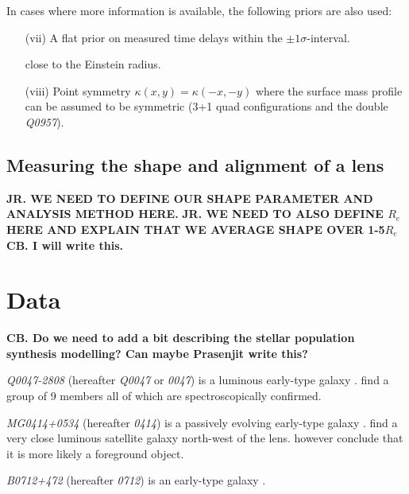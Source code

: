 \documentclass[useAMS,usenatbib]{mn2e}
\begin{document}
In cases where more information is available, the following priors are also used:

\begin{enumerate}
\item[(vii)] A flat prior on measured time delays within the $\pm 1\sigma$-interval.

close to the Einstein radius.

\item[(viii)] Point symmetry $\kappa(x,y) = \kappa(-x,-y)$ where 
the surface mass profile can be assumed to be symmetric (3+1 quad
configurations and the double \textit{Q0957}).

\end{enumerate}

\subsection{Measuring the shape and alignment of a lens}\label{sec:shapemethod}

{\bf JR. WE NEED TO DEFINE OUR SHAPE PARAMETER AND ANALYSIS METHOD HERE.} 
{\bf JR. WE NEED TO ALSO DEFINE $R_e$ HERE AND EXPLAIN THAT WE AVERAGE SHAPE OVER 1-5$R_e$} 
{\bf CB. I will write this.} 


\section{Data}\label{sec:data}

{\bf CB. Do we need to add a bit describing the stellar population synthesis modelling? Can maybe Prasenjit write this?} 


\textit{Q0047-2808} (hereafter \textit{Q0047} or \textit{0047}) is a luminous early-type galaxy \citep{1996MNRAS.278..139W}. \cite{2011ApJ...726...84W} find a group of 9 members all of which are spectroscopically confirmed.

\textit{MG0414+0534} (hereafter \textit{0414}) is a passively evolving early-type galaxy \citep{1999AJ....117.2034T}. \cite{1993AJ....105....1S} find a very close luminous satellite galaxy north-west of the lens. \citep{2011MNRAS.413L..86C} however conclude that it is more likely a foreground object.

\textit{B0712+472} (hereafter \textit{0712}) is an early-type galaxy \citep{1998AJ....115..377F}. %
\end{document}
